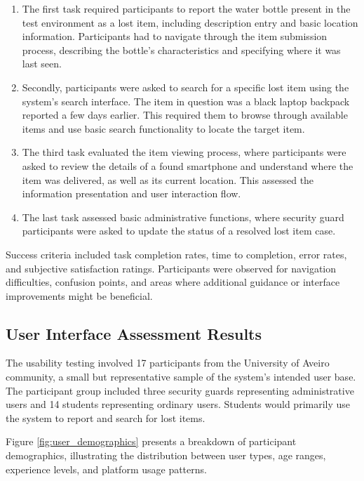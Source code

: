 \begin{enumerate}
    \item The first task required participants to report the water bottle present in the test environment as a lost item, including description entry and basic location information. Participants had to navigate through the item submission process, describing the bottle's characteristics and specifying where it was last seen.
    \item Secondly, participants were asked to search for a specific lost item using the system's search interface. The item in question was a black laptop backpack reported a few days earlier. This required them to browse through available items and use basic search functionality to locate the target item.
    \item The third task evaluated the item viewing process, where participants were asked to review the details of a found smartphone and understand where the item was delivered, as well as its current location. This assessed the information presentation and user interaction flow.
    \item The last task assessed basic administrative functions, where security guard participants were asked to update the status of a resolved lost item case.
\end{enumerate}

Success criteria included task completion rates, time to completion, error rates, and subjective satisfaction ratings. Participants were observed for navigation difficulties, confusion points, and areas where additional guidance or interface improvements might be beneficial.

\subsection{User Interface Assessment Results} \label{subsection:ui_assessment}

The usability testing involved 17 participants from the University of Aveiro community, a small but representative sample of the system's intended user base. The participant group included three security guards representing administrative users and 14 students representing ordinary users. Students would primarily use the system to report and search for lost items.

Figure \ref{fig:user_demographics} presents a breakdown of participant demographics, illustrating the distribution between user types, age ranges, experience levels, and platform usage patterns.

